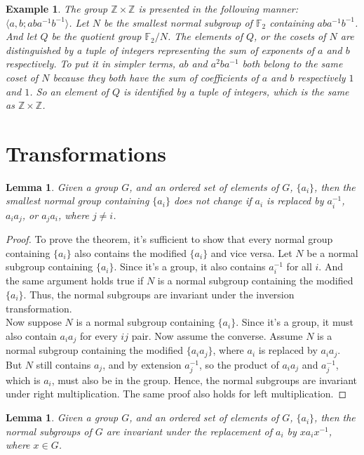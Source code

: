 \documentclass[12pt]{article}
\newtheorem{lem}[thm]{Lemma}
\newtheorem{exmp}[thm]{Example}
\theoremstyle{definition}
\begin{document}
\begin{exmp}
The group $\mathbb{Z} \times \mathbb{Z}$ is presented in the following manner: $\langle a,b;aba^{-1}b^{-1}\rangle$. Let $N$ be the smallest normal subgroup of $\mathbb{F}_2$ containing $aba^{-1}b^{-1}$. And let $Q$ be the quotient group $\mathbb{F}_2/N$. The elements of $Q$, or the cosets of $N$ are distinguished by a tuple of integers representing the sum of exponents of $a$ and $b$ respectively. To put it in simpler terms, $ab$ and $a^2ba^{-1}$ both belong to the same coset of $N$ because they both have the sum of coefficients of $a$ and $b$ respectively $1$ and $1$. So an element of $Q$ is identified by a tuple of integers, which is the same as $\mathbb{Z} \times \mathbb{Z}$.
\end{exmp}

\section{Transformations}

\begin{lem}\label{elementary}
Given a group $G$, and an ordered set of elements of $G$, $\{a_i\}$, then the smallest normal group containing $\{a_i\}$ does not change if $a_i$ is replaced by $a_i^{-1}$, $a_i a_j$, or $a_j a_i$, where $j \neq i$.
\end{lem}

\begin{proof}
To prove the theorem, it's sufficient to show that every normal group containing $\{a_i\}$ also contains the modified $\{a_i\}$ and vice versa. Let $N$ be a normal subgroup containing $\{a_i\}$. Since it's a group, it also contains $a_i^{-1}$ for all $i$. And the same argument holds true if $N$ is a normal subgroup containing the modified $\{a_i\}$. Thus, the normal subgroups are invariant under the inversion transformation.\\
Now suppose $N$ is a normal subgroup containing $\{a_i\}$. Since it's a group, it must also contain $a_ia_j$ for every $ij$ pair. Now assume the converse. Assume $N$ is a normal subgroup containing the modified $\{a_ia_j\}$, where $a_i$ is replaced by $a_ia_j$. But $N$ still contains $a_j$, and by extension $a_j^{-1}$, so the product of $a_ia_j$ and $a_j^{-1}$, which is $a_i$, must also be in the group. Hence, the normal subgroups are invariant under right multiplication. The same proof also holds for left multiplication.
\end{proof}

\begin{lem}\label{conj}
Given a group $G$, and an ordered set of elements of $G$, $\{a_i\}$, then the normal subgroups of $G$ are invariant under the replacement of $a_i$ by $xa_ix^{-1}$, where $x \in G$.
\end{lem}
\end{document}
